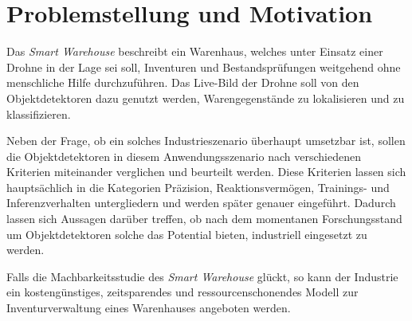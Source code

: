 \section{Problemstellung und Motivation}

Das \textit{Smart Warehouse} beschreibt ein Warenhaus, welches unter Einsatz einer Drohne in der Lage sei soll, Inventuren und Bestandsprüfungen weitgehend ohne menschliche Hilfe durchzuführen. Das Live-Bild der Drohne soll von den Objektdetektoren dazu genutzt werden, Warengegenstände zu lokalisieren und zu klassifizieren. 

Neben der Frage, ob ein solches Industrieszenario überhaupt umsetzbar ist, sollen die Objektdetektoren in diesem Anwendungsszenario nach verschiedenen Kriterien miteinander verglichen und beurteilt werden. Diese Kriterien lassen sich hauptsächlich in die Kategorien Präzision, Reaktionsvermögen, Trainings- und Inferenzverhalten untergliedern und werden später genauer eingeführt. Dadurch lassen sich Aussagen darüber treffen, ob nach dem momentanen Forschungsstand um Objektdetektoren solche das Potential bieten, industriell eingesetzt zu werden. 

Falls die Machbarkeitsstudie des \textit{Smart Warehouse} glückt, so kann der Industrie ein kostengünstiges, zeitsparendes und ressourcenschonendes Modell zur Inventurverwaltung eines Warenhauses angeboten werden.